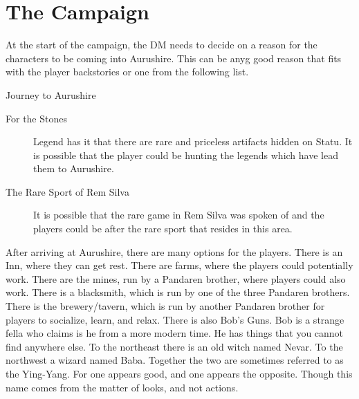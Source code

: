 \chapter{The Campaign}

At the start of the campaign, the DM needs to decide on a reason for the characters to be coming into Aurushire. This can be anyg good reason that fits with the player backstories or one from the following list.

\begin{commentbox}{Journey to Aurushire}
	\begin{description}
		\item[For the Stones] Legend has it that there are rare and priceless artifacts hidden on Statu. It is possible that the player could be hunting the legends which have lead them to Aurushire.
		\item[The Rare Sport of Rem Silva] It is possible that the rare game in Rem Silva was spoken of and the players could be after the rare sport that resides in this area.
	\end{description}
\end{commentbox}

After arriving at Aurushire, there are many options for the players. There is an Inn, where they can get rest. There are farms, where the players could potentially work. There are the mines, run by a Pandaren brother, where players could also work. There is a blacksmith, which is run by one of the three Pandaren brothers. There is the brewery/tavern, which is run by another Pandaren brother for players to socialize, learn, and relax. There is also Bob's Guns. Bob is a strange fella who claims is he from a more modern time. He has things that you cannot find anywhere else. To the northeast there is an old witch named Nevar. To the northwest a wizard named Baba. Together the two are sometimes referred to as the Ying-Yang. For one appears good, and one appears the opposite. Though this name comes from the matter of looks, and not actions. 

